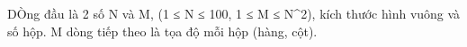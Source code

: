 DÒng đầu là 2 số N và M,  (1 ≤ N ≤ 100, 1 ≤ M ≤ N^2), kích thước hình vuông và số hộp. M dòng tiếp theo là tọa độ mỗi hộp (hàng, cột).
